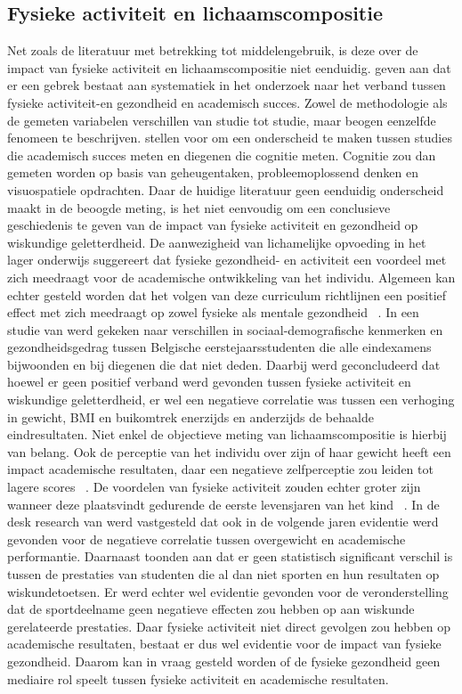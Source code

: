 \documentclass{hogent-article}
\begin{document}
\subsection{Fysieke activiteit en lichaamscompositie}
Net zoals de literatuur met betrekking tot middelengebruik, is deze over de impact van fysieke activiteit en lichaamscompositie niet eenduidig. \textcite{Singh2012} geven aan dat er een gebrek bestaat aan systematiek in het onderzoek naar het verband tussen fysieke activiteit-en gezondheid en academisch succes. Zowel de methodologie als de gemeten variabelen verschillen van studie tot studie, maar beogen eenzelfde fenomeen te beschrijven. \textcite{Howie2012} stellen voor om een onderscheid te maken tussen studies die academisch succes meten en diegenen die cognitie meten. Cognitie zou dan gemeten worden op basis van geheugentaken, probleemoplossend denken en visuospatiele opdrachten. Daar de huidige literatuur geen eenduidig onderscheid maakt in de beoogde meting, is het niet eenvoudig om een conclusieve geschiedenis te geven van de impact van fysieke activiteit en gezondheid op wiskundige geletterdheid.
De aanwezigheid van lichamelijke opvoeding in het lager onderwijs suggereert dat fysieke gezondheid- en activiteit een voordeel met zich meedraagt voor de academische ontwikkeling van het individu. Algemeen kan echter gesteld worden dat het volgen van deze curriculum richtlijnen een positief effect met zich meedraagt op zowel fysieke als mentale gezondheid ~\autocite{Castelli2013}.
In een studie van \textcite{Dielens2013} werd gekeken naar verschillen in sociaal-demografische kenmerken en gezondheidsgedrag tussen Belgische eerstejaarsstudenten die alle eindexamens bijwoonden en bij diegenen die dat niet deden. Daarbij werd geconcludeerd dat hoewel er geen positief verband werd gevonden tussen fysieke activiteit en wiskundige geletterdheid, er wel een negatieve correlatie was tussen een verhoging in gewicht, BMI en buikomtrek enerzijds en anderzijds de behaalde eindresultaten. Niet enkel de objectieve meting van lichaamscompositie is hierbij van belang. Ook de perceptie van het individu over zijn of haar gewicht heeft een impact academische resultaten, daar een negatieve zelfperceptie zou leiden tot lagere scores ~\autocite{Florin2011}.
De voordelen van fysieke activiteit zouden echter groter zijn wanneer deze plaatsvindt gedurende de eerste levensjaren van het kind ~\autocite{Stevens2008}. In de desk research van \textcite{Castelli2014} werd vastgesteld dat ook in de volgende jaren evidentie werd gevonden voor de negatieve correlatie tussen overgewicht en academische performantie. Daarnaast toonden \textcite{Yarkwah2020} aan dat er geen statistisch significant verschil is tussen de prestaties van studenten die al dan niet sporten en hun resultaten op wiskundetoetsen. Er werd echter wel evidentie gevonden voor de veronderstelling dat de sportdeelname geen negatieve effecten zou hebben op aan wiskunde gerelateerde prestaties.
Daar fysieke activiteit niet direct gevolgen zou hebben op academische resultaten, bestaat er dus wel evidentie voor de impact van fysieke gezondheid. Daarom kan in vraag gesteld worden of de fysieke gezondheid geen mediaire rol speelt tussen fysieke activiteit en academische resultaten.
\end{document}
